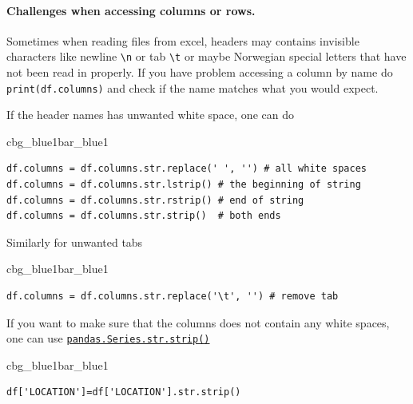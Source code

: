 \documentclass[%
oneside,                 %
final,                   %
10pt]{article}
\newenvironment{_pro_tight}[2]{
   \def\FrameCommand{\color{#2}\vrule width 1mm\normalcolor\colorbox{#1}}
   \FrameRule0.6pt\MakeFramed {\advance\hsize-2mm\FrameRestore}\vskip3mm}
   {\vskip0mm\endMakeFramed}
\newenvironment{pro}[2]{
\bgroup\rmfamily
\fboxsep=0mm\relax
\begin{_pro_tight}{#1}{#2}
\list{}{\parsep=-2mm\parskip=0mm\topsep=0pt\leftmargin=2mm
\rightmargin=2\leftmargin\leftmargin=4pt\relax}
\item\relax}
{\endlist\end{_pro_tight}\egroup}
\newenvironment{notice_mdfboxadmon}[1][]{
\begin{notice_mdfboxmdframed}[frametitle=#1]
}
{
\end{notice_mdfboxmdframed}
}
\begin{document}
\paragraph{Challenges when accessing columns or rows.}

\begin{notice_mdfboxadmon}
Sometimes when reading files from excel, headers may contains invisible characters like newline \Verb!\n! or tab \Verb!\t! or maybe Norwegian special letters that have not been read in properly. If you have problem accessing a column by name do \texttt{print(df.columns)} and check if the name matches what you would expect.
\end{notice_mdfboxadmon} %



If the header names has unwanted white space, one can do





\begin{pro}{cbg_blue1}{bar_blue1}\begin{Verbatim}[numbers=none,fontsize=\fontsize{9pt}{9pt},baselinestretch=0.95,xleftmargin=2mm]
df.columns = df.columns.str.replace(' ', '') # all white spaces
df.columns = df.columns.str.lstrip() # the beginning of string
df.columns = df.columns.str.rstrip() # end of string
df.columns = df.columns.str.strip()  # both ends

\end{Verbatim}
\end{pro}
\noindent

Similarly for unwanted tabs


\begin{pro}{cbg_blue1}{bar_blue1}\begin{Verbatim}[numbers=none,fontsize=\fontsize{9pt}{9pt},baselinestretch=0.95,xleftmargin=2mm]
df.columns = df.columns.str.replace('\t', '') # remove tab

\end{Verbatim}
\end{pro}
\noindent

If you want to make sure that the columns does not contain any white spaces, one can use \href{{https://pandas.pydata.org/pandas-docs/version/1.2.4/reference/api/pandas.Series.str.strip.html}}{\nolinkurl{pandas.Series.str.strip()}}


\begin{pro}{cbg_blue1}{bar_blue1}\begin{Verbatim}[numbers=none,fontsize=\fontsize{9pt}{9pt},baselinestretch=0.95,xleftmargin=2mm]
df['LOCATION']=df['LOCATION'].str.strip()

\end{Verbatim}
\end{pro}
\noindent
\end{document}

